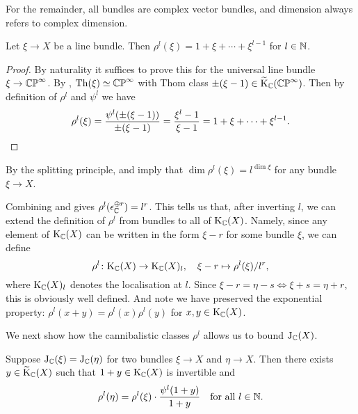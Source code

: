 \begin{convention}
  \label{complex-convention}
  For the remainder, all bundles are complex vector bundles, and
  dimension always refers to complex dimension.
\end{convention}

\begin{lemma}
  \label{cannibal-line}
  Let $\xi \to X$ be a line bundle. Then $\rho^l(\xi) = 1 + \xi +
  \cdots + \xi^{l-1}$ for $l \in \mathbb{N}$.
\end{lemma}

\begin{proof}
  By naturality it suffices to prove this for the universal line
  bundle $\xi \to \mathbb{CP}^{\infty}$. By , $\operatorname{Th}(\xi) \simeq
  \mathbb{CP}^\infty$ with Thom class $\pm(\xi - 1) \in
  \widetilde{\mathrm{K}}_{\mathbb{C}}(\mathbb{CP}^\infty)$. Then by definition of $\rho^l$ and $\psi^l$
  we have
  \[
  \rho^l(\xi) = \frac{\psi^l(\pm(\xi-1))}{\pm(\xi-1)} = \frac{\xi^l -
    1}{\xi - 1} = 1 + \xi + \cdots + \xi^{l-1}. \qedhere
  \]
\end{proof}

\begin{remark}
  \label{cannibal-dim}
  By the splitting principle,  and
   imply that $\dim \rho^l(\xi) = l^{\dim \xi}$
  for any bundle $\xi \to X$.
\end{remark}

\begin{nothing}
  \label{cannibal-extend}
  Combining  and  gives
  $\rho^l(\epsilon_{\mathbb{C}}^{\oplus r}) = l^r$. This tells us that, after
  inverting $l$, we can extend the definition of $\rho^l$ from bundles
  to all of $\mathrm{K}_{\mathbb{C}}(X)$. Namely, since any element of $\mathrm{K}_{\mathbb{C}}(X)$ can be
  written in the form $\xi - r$ for some bundle $\xi$, we can define
  \[
  \rho^l \colon \mathrm{K}_{\mathbb{C}}(X) \to \mathrm{K}_{\mathbb{C}}(X)_l, \quad \xi - r \mapsto
  \rho^l(\xi)/l^r,
  \]
  where $\mathrm{K}_{\mathbb{C}}(X)_l$ denotes the localisation at $l$. Since $\xi - r =
  \eta - s \iff \xi + s = \eta + r$, this is obviously well
  defined. And note we have preserved the exponential property:
  $\rho^l(x+y) = \rho^l(x)\rho^l(y)$ for $x,y \in \mathrm{K}_{\mathbb{C}}(X)$.
\end{nothing}

We next show how the cannibalistic classes $\rho^l$ allows us to bound
$\mathrm{J}_{\mathbb{C}}(X)$.

\begin{lemma}
  \label{jprime-condition}
  Suppose $\mathrm{J}_{\mathbb{C}}(\xi) = \mathrm{J}_{\mathbb{C}}(\eta)$ for two bundles $\xi \to X$ and
  $\eta \to X$. Then there exists $y \in \widetilde{\mathrm{K}}_{\mathbb{C}}(X)$ such that $1+y
  \in \mathrm{K}_{\mathbb{C}}(X)$ is invertible and
  \[
  \rho^l(\eta) = \rho^l(\xi) \cdot \frac{\psi^l(1+y)}{1+y} \quad
  \text{for all } l \in \mathbb{N}.
  \]
\end{lemma}

